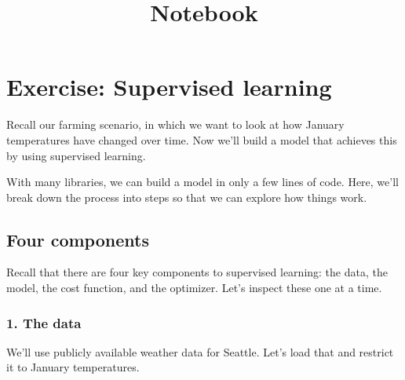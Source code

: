 \documentclass[11pt]{article}
\title{Notebook}
\begin{document}
    
    \maketitle
    
    

    
    \hypertarget{exercise-supervised-learning}{%
\section{Exercise: Supervised
learning}\label{exercise-supervised-learning}}

Recall our farming scenario, in which we want to look at how January
temperatures have changed over time. Now we'll build a model that
achieves this by using supervised learning.

With many libraries, we can build a model in only a few lines of code.
Here, we'll break down the process into steps so that we can explore how
things work.

\hypertarget{four-components}{%
\subsection{Four components}\label{four-components}}

Recall that there are four key components to supervised learning: the
data, the model, the cost function, and the optimizer. Let's inspect
these one at a time.

\hypertarget{the-data}{%
\subsubsection{1. The data}\label{the-data}}

We'll use publicly available weather data for Seattle. Let's load that
and restrict it to January temperatures.
\end{document}

